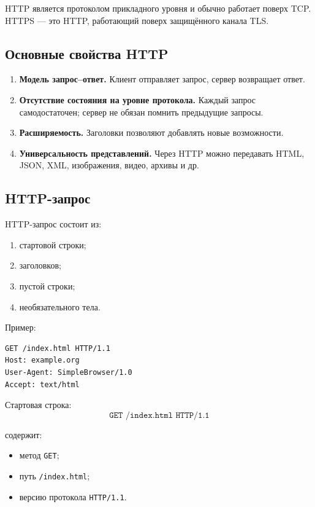 \documentclass[12pt,a4paper]{article}
\begin{document}
HTTP является протоколом прикладного уровня и обычно работает поверх TCP. HTTPS --- это HTTP, работающий поверх защищённого канала TLS.

\subsection{Основные свойства HTTP}

\begin{enumerate}
    \item \textbf{Модель запрос--ответ.} Клиент отправляет запрос, сервер возвращает ответ.
    \item \textbf{Отсутствие состояния на уровне протокола.} Каждый запрос самодостаточен; сервер не обязан помнить предыдущие запросы.
    \item \textbf{Расширяемость.} Заголовки позволяют добавлять новые возможности.
    \item \textbf{Универсальность представлений.} Через HTTP можно передавать HTML, JSON, XML, изображения, видео, архивы и др.
\end{enumerate}

\subsection{HTTP-запрос}

HTTP-запрос состоит из:
\begin{enumerate}
    \item стартовой строки;
    \item заголовков;
    \item пустой строки;
    \item необязательного тела.
\end{enumerate}

Пример:
\begin{lstlisting}
GET /index.html HTTP/1.1
Host: example.org
User-Agent: SimpleBrowser/1.0
Accept: text/html

\end{lstlisting}

Стартовая строка:
\[
\texttt{GET /index.html HTTP/1.1}
\]

содержит:
\begin{itemize}
    \item метод \texttt{GET};
    \item путь \texttt{/index.html};
    \item версию протокола \texttt{HTTP/1.1}.
\end{itemize}
\end{document}

